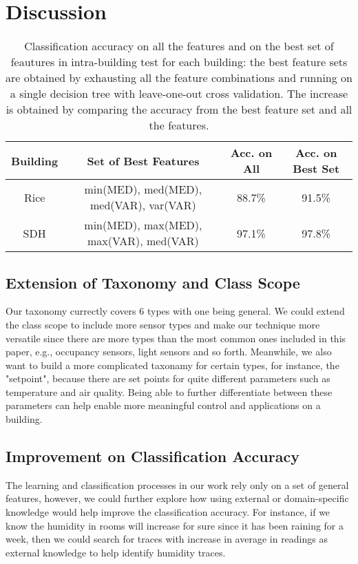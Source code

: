 \section{Discussion}
\begin{table*}
    \centering %
    \begin{tabular}{c|c|c|c}%
        \hline %
        Building & Set of Best Features & Acc. on All & Acc. on Best Set \\ %
        \hline\hline %
        Rice & min(MED), med(MED), med(VAR), var(VAR) & 88.7\% & 91.5\% \\ \hline
        SDH & min(MED), max(MED), max(VAR), med(VAR) & 97.1\% & 97.8\% \\\hline
    \end{tabular}
    \caption{Classification accuracy on all the features and on the best set of feautures in intra-building test for each building: the best feature sets are obtained by exhausting all the feature combinations and running on a single decision tree with leave-one-out cross validation. The increase is obtained by comparing the accuracy from the best feature set and all the features.}
    \label{table:feature} %
\end{table*}

\subsection{Extension of Taxonomy and Class Scope}
Our taxonomy currectly covers 6 types with one being general. We could extend the class scope to include more sensor types and make our technique more versatile since there are 
more types than the most common ones included in this paper, e.g., occupancy sensors, light sensors and so forth. Meanwhile, we also want to build a more complicated taxonamy for certain types, 
for instance, the "setpoint", because there are set points for quite different parameters such as temperature and air quality. Being able to further differentiate between these parameters can
help enable more meaningful control and applications on a building.

\subsection{Improvement on Classification Accuracy}
The learning and classification processes in our work rely only on a set of general features, however, we could further explore how using external or domain-specific knowledge 
would help improve the classification accuracy. For instance, if we know the humidity in rooms will increase for sure since it has been raining for a week, then we could search for 
traces with increase in average in readings as external knowledge to help identify humidity traces. 

